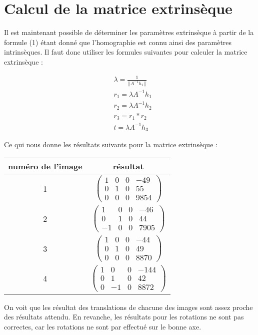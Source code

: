 \documentclass[a4paper,10pt]{article}
\begin{document}
\section{Calcul de la matrice extrinsèque}
Il est maintenant possible de déterminer les paramètres extrinsèque à partir de la formule (1)
étant donné que l'homographie est connu ainsi des paramètres intrinsèques. Il faut donc utiliser
les formules suivantes pour calculer la matrice extrinsèque : 

\begin{align}
 &\lambda = \frac{1}{||A^{-1}h_1||}\\
 &r_1=\lambda A^{-1}h_1\\
 &r_2=\lambda A^{-1}h_2\\
 &r_3=r_1*r_2\\
 &t=\lambda A^{-1}h_3
\end{align}

Ce qui nous donne les résultats suivants pour la matrice extrinsèque :\\ 

\begin{center}
\begin{tabular}{|c|c|}
 \hline
 numéro de l'image & résultat\\
 \hline
 1 & $\begin{pmatrix} 1 & 0 & 0 & -49\\0 & 1 & 0 & 55\\ 0 & 0 & 0 & 9854\end{pmatrix}$\\
 \hline
 2 & $\begin{pmatrix} 1 & 0 & 0 & -46\\0 & 1 & 0 & 44\\ -1 & 0 & 0 & 7905\end{pmatrix}$\\
 \hline
 3 & $\begin{pmatrix} 1 & 0 & 0 & -44\\0 & 1 & 0 & 49\\ 0 & 0 & 0 & 8870\end{pmatrix}$\\
 \hline
 4 & $\begin{pmatrix} 1 & 0 & 0 & -144\\0 & 1 & 0 & 42\\ 0 & -1 & 0 & 8872\end{pmatrix}$\\
 \hline
\end{tabular}
\end{center}
On voit que les résultat des translations de chacune des images sont assez proche des résultats
attendu. En revanche, les résultats pour les rotations ne sont pas correctes, car les rotations
ne sont par effectué sur le bonne axe.
\end{document}
